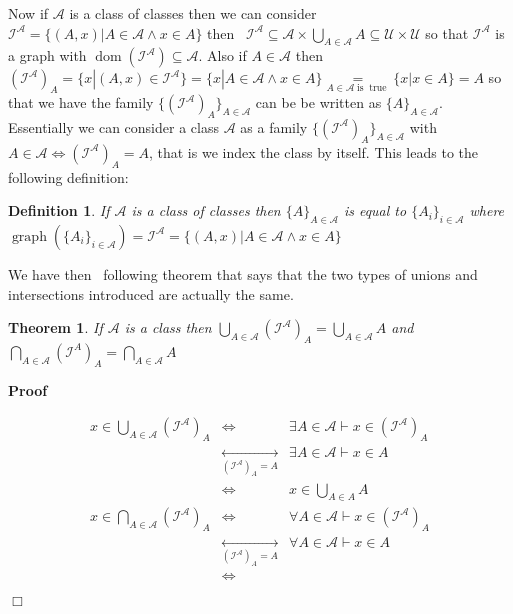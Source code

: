 \documentclass{book}
\newcommand{\Leftrightarrowlim}{\mathop{\leftrightarrow}\limits}
\newcommand{\equallim}{\mathop{=}\limits}
\newcommand{\nobracket}{}
\newcommand{\tmop}[1]{\ensuremath{\operatorname{#1}}}
\newenvironment{proof}{\noindent\textbf{Proof\ }}{\hspace*{\fill}$\Box$\medskip}
\newtheorem{definition}{Definition}
{\theorembodyfont{\rmfamily}\newtheorem{example}{Example}}
\newtheorem{theorem}{Theorem}
\begin{document}
{{Now if $\mathcal{A}$ is a class of classes then we can consider
$\mathcal{I}^{\mathcal{A}} = \{ (A, x) | A \in \mathcal{A} \wedge x \in A
\nobracket \}$ then \ $\mathcal{I}^{\mathcal{A}} \subseteq \mathcal{A} \times
\bigcup_{A \in \mathcal{A}} A \subseteq \mathcal{U} \times \mathcal{U}$ so
that $\mathcal{I}^{\mathcal{A}}$ is a graph with $\tmop{dom}
(\mathcal{I}^{\mathcal{A}}) \subseteq \mathcal{A}$. Also if $A \in
\mathcal{A}$ then $(\mathcal{I}^{\mathcal{A}})_A = \{ x | (A, x) \in
\mathcal{I}^{\mathcal{A}} \nobracket \} = \{ x | A \in \mathcal{A} \wedge x
\in A \nobracket \} \equallim_{A \in \mathcal{A} \tmop{is} \tmop{true}} \{ x|x
\in A \} = A$ so that we have the family $\{ (\mathcal{I}^{\mathcal{A}})_A
\}_{A \in \mathcal{A}}$ can be be written as $\{ A \}_{A \in \mathcal{A}}$.
Essentially we can consider a class $\mathcal{A}$ as a family $\{
(\mathcal{I}^{\mathcal{A}})_A \}_{A \in \mathcal{A}}$ with $A \in \mathcal{A}
\Leftrightarrow (\mathcal{I}^{\mathcal{A}})_A = A$, that is we index the class
by itself. This leads to the following definition:

\begin{definition}
  \label{family of classes indexed by itself}If $\mathcal{A}$ is a class of
  classes then $\{ A \}_{A \in \mathcal{A}}$ is equal to $\{ A_i \}_{i \in
  \mathcal{A}}$ where $\tmop{graph} (\{ A_i \}_{i \in \mathcal{A}})
  =\mathcal{I}^{\mathcal{A}} = \{ (A, x) |A \in \mathcal{A} \wedge x \in A \}$
\end{definition}

We have then \ following theorem that says that the two types of unions and
intersections introduced are actually the same.

\begin{theorem}
  \label{union of family of classes}If $\mathcal{A}$ is a class then
  $\bigcup_{A \in \mathcal{A}} (\mathcal{I}^{\mathcal{A}})_A = \bigcup_{A \in
  \mathcal{A}} A$ and $\bigcap_{A \in \mathcal{A}} (\mathcal{I}^A)_A =
  \bigcap_{A \in \mathcal{A}} A$ 
\end{theorem}

\begin{proof}
  
  \begin{eqnarray*}
    x \in \bigcup_{A \in \mathcal{A}} (\mathcal{I}^{\mathcal{A}})_A &
    \Leftrightarrow & \exists A \in \mathcal{A} \vdash x \in
    (\mathcal{I}^{\mathcal{A}})_A\\
    & \Leftrightarrowlim_{(\mathcal{I}^{\mathcal{A}})_A = A} & \exists A \in
    \mathcal{A} \vdash x \in A\\
    & \Leftrightarrow & x \in \bigcup_{A \in A} A\\
    x \in \bigcap_{A \in \mathcal{A}} (\mathcal{I}^{\mathcal{A}})_A &
    \Leftrightarrow & \forall A \in \mathcal{A} \vdash x \in
    (\mathcal{I}^{\mathcal{A}})_A\\
    & \Leftrightarrowlim_{(\mathcal{I}^{\mathcal{A}})_A = A} & \forall A \in
    \mathcal{A} \vdash x \in A\\
    & \Leftrightarrow & 
  \end{eqnarray*}
  

\end{proof}}}
\end{document}
